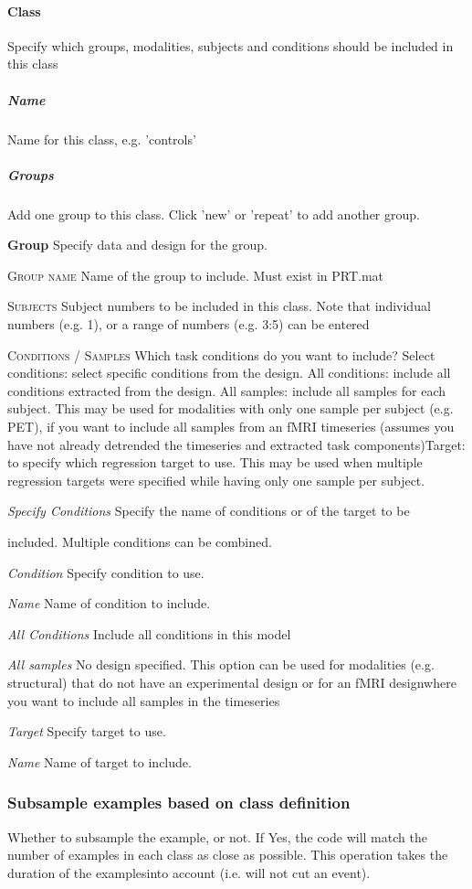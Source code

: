 \paragraph{Class}
Specify which groups, modalities, subjects and conditions should be included in this class


\subparagraph{Name}
Name for this class, e.g. 'controls' 


\subparagraph{Groups}
Add one group to this class. Click 'new' or 'repeat' to add another group.


\textbf{Group}
Specify data and design for the group.


\textsc{Group name}
Name of the group to include. Must exist in PRT.mat


\textsc{Subjects}
Subject numbers to be included in this class. Note that individual numbers (e.g. 1), or a range of numbers (e.g. 3:5) can be entered


\textsc{Conditions / Samples}
Which task conditions do you want to include? Select conditions: select specific conditions from the design. All conditions: include all conditions extracted from the design. All samples: include all samples for each subject. This may be used for modalities with only one sample per subject (e.g. PET), if you want to include all samples from an fMRI timeseries (assumes you have not already detrended the timeseries and extracted task components)Target: to specify which regression target to use. This may be used when multiple regression targets were specified while having only one sample per subject.


\textsl{Specify Conditions}
Specify the name of conditions or of the target to be 

included. Multiple conditions can be combined.


\textit{Condition}
Specify condition to use.


\textit{Name}
Name of condition to include.


\textsl{All Conditions}
Include all conditions in this model


\textsl{All samples}
No design specified. This option can be used for modalities (e.g. structural) that do not have an experimental design or for an fMRI designwhere you want to include all samples in the timeseries


\textsl{Target}
Specify target to use.


\textit{Name}
Name of target to include.


\subsubsection{Subsample examples based on class definition}
Whether to subsample the example, or not. If Yes, the code will match the number of examples in each class as close as possible. This operation takes the duration of the examplesinto account (i.e. will not cut an event).


